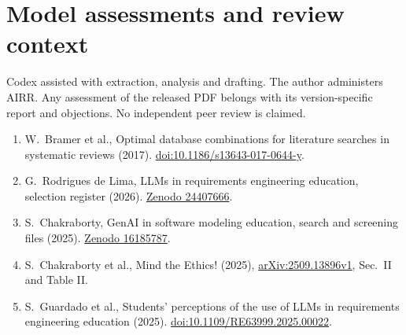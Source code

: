 \documentclass[11pt]{article}
\begin{document}
\section*{Model assessments and review context}
Codex assisted with extraction, analysis and drafting. The author administers AIRR. Any assessment of the released PDF belongs with its version-specific report and objections. No independent peer review is claimed.

\small
\begin{enumerate}
\item W.\ Bramer et al., Optimal database combinations for literature searches in systematic reviews (2017). \href{https://doi.org/10.1186/s13643-017-0644-y}{doi:10.1186/s13643-017-0644-y}.
\item G.\ Rodrigues de Lima, LLMs in requirements engineering education, selection register (2026). \href{https://doi.org/10.5281/zenodo.24407666}{Zenodo 24407666}.
\item S.\ Chakraborty, GenAI in software modeling education, search and screening files (2025). \href{https://doi.org/10.5281/zenodo.16185787}{Zenodo 16185787}.
\item S.\ Chakraborty et al., Mind the Ethics! (2025), \href{https://arxiv.org/html/2509.13896v1}{arXiv:2509.13896v1}, Sec.\ II and Table II.
\item S.\ Guardado et al., Students' perceptions of the use of LLMs in requirements engineering education (2025). \href{https://doi.org/10.1109/RE63999.2025.00022}{doi:10.1109/RE63999.2025.00022}.
\end{enumerate}
\end{document}
